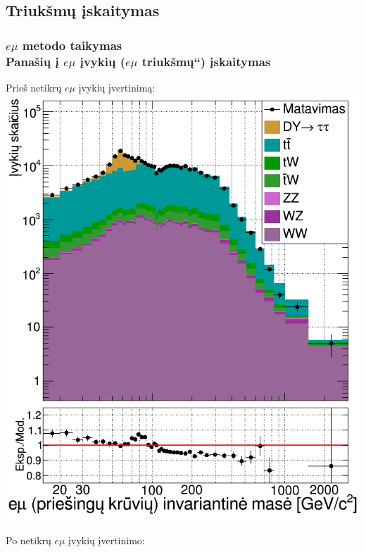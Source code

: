 \documentclass[xcolor=dvipsnames]{beamer}
\newcommand{\ltq}[1]{{\quotedblbase{}#1\textquotedblleft{}}}
\newcommand{\emu}{\mathit{e}\mu}
\begin{document}
\begin{frame}
	\section{Triukšmų įskaitymas}
	\frametitle{$\emu$ metodo taikymas\\ \normalsize Panašių į $\emu$ įvykių (\ltq{$\emu$ triukšmų}) įskaitymas}
	\begin{minipage}{0.44\textwidth}
		Prieš netikrų $\emu$ įvykių įvertinimą:
		\includegraphics[width=\linewidth]{emuMassOS_SMALL.png}
	\end{minipage}
	\hfill
	\begin{minipage}{0.44\textwidth}
		Po netikrų $\emu$ įvykių įvertinimo:

\end{minipage}
\end{frame}
\end{document}

